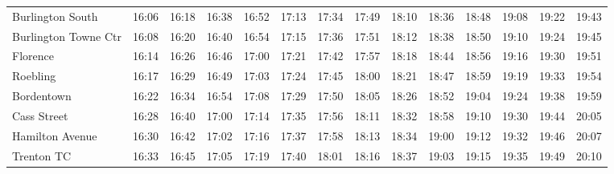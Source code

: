 \begin{center}
\begin{tabular}{@{}lrrrrrrrrrrrrr@{}}
Burlington South & 16:06 & 16:18 & 16:38 & 16:52 & 17:13 & 17:34 & 17:49 & 18:10 & 18:36 & 18:48 & 19:08 & 19:22 & 19:43 \\
Burlington Towne Ctr & 16:08 & 16:20 & 16:40 & 16:54 & 17:15 & 17:36 & 17:51 & 18:12 & 18:38 & 18:50 & 19:10 & 19:24 & 19:45 \\
Florence & 16:14 & 16:26 & 16:46 & 17:00 & 17:21 & 17:42 & 17:57 & 18:18 & 18:44 & 18:56 & 19:16 & 19:30 & 19:51 \\
Roebling & 16:17 & 16:29 & 16:49 & 17:03 & 17:24 & 17:45 & 18:00 & 18:21 & 18:47 & 18:59 & 19:19 & 19:33 & 19:54 \\
Bordentown & 16:22 & 16:34 & 16:54 & 17:08 & 17:29 & 17:50 & 18:05 & 18:26 & 18:52 & 19:04 & 19:24 & 19:38 & 19:59 \\
Cass Street & 16:28 & 16:40 & 17:00 & 17:14 & 17:35 & 17:56 & 18:11 & 18:32 & 18:58 & 19:10 & 19:30 & 19:44 & 20:05 \\
Hamilton Avenue & 16:30 & 16:42 & 17:02 & 17:16 & 17:37 & 17:58 & 18:13 & 18:34 & 19:00 & 19:12 & 19:32 & 19:46 & 20:07 \\
Trenton TC & 16:33 & 16:45 & 17:05 & 17:19 & 17:40 & 18:01 & 18:16 & 18:37 & 19:03 & 19:15 & 19:35 & 19:49 & 20:10 \\
\bottomrule\end{tabular}\end{center}
